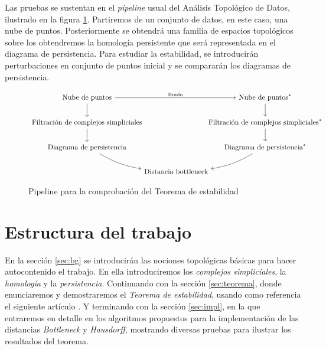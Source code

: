 Las pruebas se sustentan en el \emph{pipeline} usual del Análisis Topológico de Datos, ilustrado en la figura \ref{ref:pipeline}. Partiremos de un conjunto de datos, en este caso, una nube de puntos. Posteriormente se obtendrá una familia de espacios topológicos sobre los obtendremos la homología persistente que será representada en el diagrama de persistencia. Para estudiar la estabilidad, se introducirán perturbaciones en conjunto de puntos inicial y se compararán los diagramas de persistencia.

\begin{figure}[ht]
\[
\begin{tikzcd}[
  column sep={125pt,between origins}
]
\text{Nube de puntos} \arrow[d] \arrow[rr, "\text{Ruido}"] &                             & \text{Nube de puntos}^* \arrow[d]                       \\
\text{Filtración de complejos simpliciales} \arrow[d]      & 
& \text{Filtración de complejos simpliciales}^* \arrow[d] \\
\text{Diagrama de persistencia} \arrow[rd, bend right=10]                 &                             & \text{Diagrama de persistencia}^* \arrow[ld,bend left=10]            \\
&\text{Distancia bottleneck} &
\end{tikzcd}
\]
\caption{Pipeline para la comprobación del Teorema de estabilidad}
\label{ref:pipeline}
\end{figure}

\section{Estructura del trabajo}
En la sección \ref{sec:bg} se introducirán las nociones topológicas básicas para hacer autocontenido el trabajo. En ella introduciremos los \emph{complejos simpliciales}, la \emph{homología} y la \emph{persistencia}. Continuando con la sección \ref{sec:teorema}, donde enunciaremos y demostraremos el \emph{Teorema de estabilidad}, usando como referencia el siguiente artículo \cite{Cohen-Steiner2007}. Y terminando con la sección \ref{sec:impl}, en la que entraremos en detalle en los algoritmos propuestos para la implementación de las distancias \emph{Bottleneck} y \emph{Hausdorff}, mostrando diversas pruebas para ilustrar los resultados del teorema.
